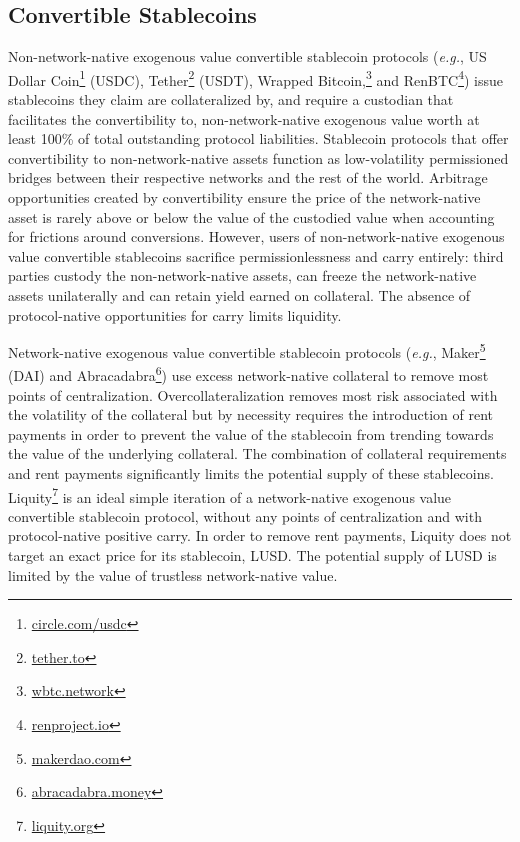 \documentclass[tikz]{article}
\newcommand{\term}[1]{\textsl{#1}}
\newcommand{\fref}[1]{\footnote{\href{http://#1}{#1}}}
\begin{document}

\subsection{Convertible Stablecoins} 

Non-network-native exogenous value convertible stablecoin protocols (\term{e.g.}, US Dollar Coin\fref{circle.com/usdc} (USDC), Tether\fref{tether.to} (USDT), Wrapped Bitcoin,\fref{wbtc.network} and RenBTC\fref{renproject.io}) issue stablecoins they claim are collateralized by, and require a custodian that facilitates the convertibility to, non-network-native exogenous value worth at least 100\% of total outstanding protocol liabilities. Stablecoin protocols that offer convertibility to non-network-native assets function as low-volatility permissioned bridges between their respective networks and the rest of the world. Arbitrage opportunities created by convertibility ensure the price of the network-native asset is rarely above or below the value of the custodied value when accounting for frictions around conversions. However, users of non-network-native exogenous value convertible stablecoins sacrifice permissionlessness and carry entirely: third parties custody the non-network-native assets, can freeze the network-native assets unilaterally and can retain yield earned on collateral. The absence of protocol-native opportunities for carry limits liquidity.

\newpage

Network-native exogenous value convertible stablecoin protocols (\term{e.g.}, Maker\fref{makerdao.com} (DAI) and Abracadabra\fref{abracadabra.money}) use excess network-native collateral to remove most points of centralization. Overcollateralization removes most risk associated with the volatility of the collateral but by necessity requires the introduction of rent payments in order to prevent the value of the stablecoin from trending towards the value of the underlying collateral. The combination of collateral requirements and rent payments significantly limits the potential supply of these stablecoins. Liquity\fref{liquity.org} is an ideal simple iteration of a network-native exogenous value convertible stablecoin protocol, without any points of centralization and with protocol-native positive carry. In order to remove rent payments, Liquity does not target an exact price for its stablecoin, LUSD. The potential supply of LUSD is limited by the value of trustless network-native value. 
\end{document}
